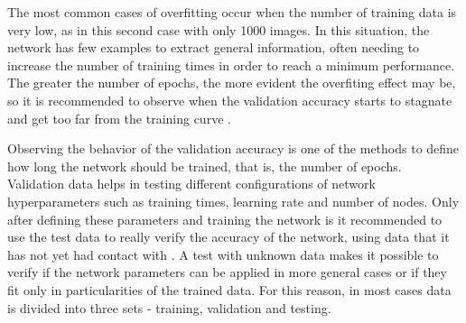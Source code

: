The most common cases of overfitting occur when the number of training data is very low, as in this second case with only 1000 images. In this situation, the network has few examples to extract general information, often needing to increase the number of training times in order to reach a minimum performance. The greater the number of epochs, the more evident the overfiting effect may be, so it is recommended to observe when the validation accuracy starts to stagnate and get too far from the training curve \cite{nielsen2015}.

Observing the behavior of the validation accuracy is one of the methods to define how long the network should be trained, that is, the number of epochs. Validation data helps in testing different configurations of network hyperparameters such as training times, learning rate and number of nodes. Only after defining these parameters and training the network is it recommended to use the test data to really verify the accuracy of the network, using data that it has not yet had contact with \cite{nielsen2015}. A test with unknown data makes it possible to verify if the network parameters can be applied in more general cases or if they fit only in particularities of the trained data. For this reason, in most cases data is divided into three sets - training, validation and testing.